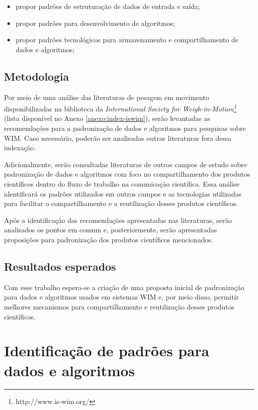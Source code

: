 \documentclass{ufscThesis}
\begin{document}
\begin{itemize}
\item  propor padrões de estruturação de dados de entrada e saída;
\item  propor padrões para desenvolvimento de algoritmos;
\item  propor padrões tecnológicos para armazenamento e compartilhamento de dados e algoritmos;
\end{itemize}


\section{Metodologia}\label{introducao-metodologia}
Por meio de uma análise das literaturas de pesagem em movimento disponibilizadas na biblioteca da \textit{International Society for Weigh-in-Motion\footnote{http://www.is-wim.org/}} (lista disponível no Anexo \ref{anexo:index-iswim}), serão levantadas as recomendações para a padronização de dados e algoritmos para pesquisas sobre WIM. Caso necessário, poderão ser analisadas outras literaturas fora dessa indexação.

Adicionalmente, serão consultadas literaturas de outros campos de estudo sobre padronização de dados e algoritmos com foco no compartilhamento dos produtos científicos dentro do fluxo de trabalho na comunicação científica. Essa análise identificará os padrões utilizados em outros campos e as tecnologias utilizadas para facilitar o compartilhamento e a reutilização desses produtos científicos.

Após a identificação das recomendações apresentadas nas literaturas, serão analisados os pontos em comum e, posteriormente, serão apresentadas proposições para padronização dos produtos científicos mencionados.

\section{Resultados esperados}\label{introducao-resultados}
Com esse trabalho espera-se a criação de uma proposta inicial de padronização para dados e algoritmos usados em sistemas WIM e, por meio disso, permitir melhores mecanismos para compartilhamento e reutilização desses produtos científicos.



\chapter{Identificação de padrões para dados e algoritmos}\label{id-standards}
\end{document}
